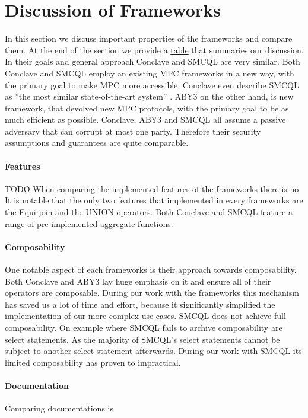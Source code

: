 \section{Discussion of Frameworks}
In this section we discuss important properties of the frameworks and compare them. 
At the end of the section we provide a \hyperref[Summary]{table} that summaries our discussion.
In their goals and general approach Conclave and SMCQL are very similar. Both Conclave and SMCQL employ an existing MPC frameworks in a new way, with the primary goal to make MPC more accessible. Conclave even describe SMCQL as ''the most similar state-of-the-art system'' \cite{10.1145/3302424.3303982}. ABY3 on the other hand, is new framework, that devolved new MPC protocols, with the primary goal to be as much efficient as possible. 
Conclave, ABY3 and SMCQL all assume a passive adversary that can corrupt at most one party. Therefore their security assumptions and guarantees are quite comparable. 
\paragraph{Features} TODO
When comparing the implemented features of the frameworks there is no 
It is notable that the only two features that implemented in every frameworks are the Equi-join and the UNION operators. 
Both Conclave and SMCQL feature a range of pre-implemented aggregate functions.  
\paragraph{Composability}
One notable aspect of each frameworks is their approach towards composability. Both Conclave and ABY3 lay huge emphasis on it and ensure all of their operators are composable. During our work with the frameworks this mechanism has saved us a lot of time and effort, because it significantly simplified the implementation of our more complex use cases.
SMCQL does not achieve full composability. On example where SMCQL fails to archive composability are select statements. As the majority of SMCQL's select statements cannot be subject to another select statement afterwards. During our work with SMCQL its limited composability has proven to impractical. 
\paragraph{Documentation}
Comparing documentations is 
